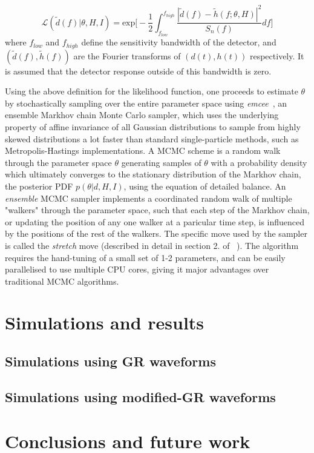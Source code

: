 \documentclass[prd,preprintnumbers,twocolumn,eqsecnum,floatfix,a4paper,nofootinbib,superscriptaddress]{revtex4}
\begin{document}
\begin{equation}
\mathcal{L}(\tilde{d}(f)|\theta, H,I) = \text{exp}\Big[ -\frac{1}{2}\int_{f_{low}}^{f_{high}} \frac{|\tilde{d}(f) - \tilde{h}(f;\theta, H)|^2}{S_n(f)}df\Big]
\end{equation}
where $f_{low}$ and $f_{high}$ define the sensitivity bandwidth of the detector, and $(\tilde{d}(f), \tilde{h}(f))$ are the Fourier transforms of $(d(t), h(t))$ respectively. It is assumed that the detector response outside of this bandwidth is zero. 

Using the above definition for the likelihood function, one proceeds to estimate $\theta$ by stochastically sampling over the entire parameter space using  \emph{emcee}~\cite{goodman2010ensemble,foreman2013emcee}, an ensemble Markhov chain Monte Carlo sampler, which uses the underlying property of affine invariance of all Gaussian distributions to sample from highly skewed distributions a lot faster than standard single-particle methods, such as Metropolis-Hastings implementations. A MCMC scheme is a random walk through the parameter space $\theta$ generating samples of $\theta$ with a probability density which ultimately converges to the stationary distribution of the Markhov chain, the posterior PDF $p(\theta|d, H, I)$, using the equation of detailed balance. An \emph{ensemble} MCMC sampler implements a coordinated random walk of multiple "walkers" through the parameter space, such that each step of the Markhov chain, or updating the position of any one walker at a paricular time step, is influenced by the positions of the rest of the walkers. The specific move used by the sampler is called the \emph{stretch} move (described in detail in section 2. of ~\cite{goodman2010ensemble}). The algorithm requires the hand-tuning of a small set of 1-2 parameters, and can be easily parallelised to use multiple CPU cores, giving it major advantages over traditional MCMC algorithms.

\section{Simulations and results}
\subsection{Simulations using GR waveforms}
\subsection{Simulations using modified-GR waveforms}
\section{Conclusions and future work}
%
%


\end{document}
